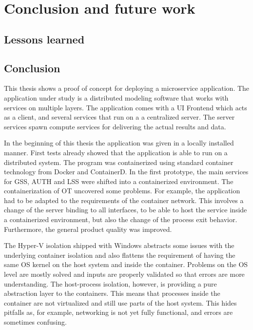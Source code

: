 
\chapter{Conclusion and future work} %

\label{chap:conclusion} %


\section{Lessons learned}

\section{Conclusion}
This thesis shows a proof of concept for deploying a microservice application. 
The application under study is a distributed modeling software that works with services on multiple layers.
The application comes with a \ac{UI} Frontend which acts as a client, and  several services that run on a a centralized server. The server services spawn compute services for delivering the actual results and data.

In the beginning of this thesis the application was given in a locally installed manner. First tests already showed that the application is able to run on a distributed system. 
The program was containerized using standard container technology from Docker and ContainerD. In the first prototype, the main services for \ac{GSS}, \ac{AUTH} and \ac{LSS} were shifted into a containerized environment.  
The containerization of \ac{OT} uncovered some problems. For example, the application had to be adapted to the requirements of the container network. This involves a change of the server binding to all interfaces, to be able to host the service inside a containerized environment, but also the change of the process exit behavior. Furthermore, the general product quality was improved.

The Hyper-V isolation shipped with \ac{Windows} abstracts some issues with the underlying container isolation and also flattens the requirement of having the same \ac{OS} kernel on the host system and inside the container. Problems on the \ac{OS} level are mostly solved and inputs are properly validated so that errors are more understanding.
The host-process isolation, however, is providing a pure abstraction layer to the containers. This means that processes inside the container are not virtualized and still use parts of the host system.
This hides pitfalls as, for example, networking is not yet fully functional, and errors are sometimes confusing.

